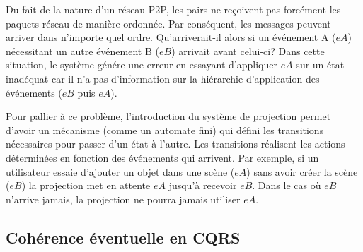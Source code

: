 Du fait de la nature d'un réseau \gls{P2P}, les pairs ne reçoivent pas forcément les 
paquets réseau de manière ordonnée.
Par conséquent, les messages peuvent arriver dans n'importe quel ordre.
Qu'arriverait-il alors si un événement A ($eA$) nécessitant un autre événement B 
($eB$) arrivait avant celui-ci? Dans cette situation, le système génére une 
erreur en essayant d'appliquer $eA$ sur un état inadéquat car il n'a pas 
d'information sur la hiérarchie d'application des événements ($eB$ puis $eA$).

Pour pallier à ce problème, l'introduction du système de projection permet d'avoir 
un mécanisme (comme un automate fini) qui défini les transitions nécessaires 
pour 
passer d'un état à l'autre. Les transitions réalisent les actions déterminées en 
fonction des 
événements qui arrivent. Par exemple, si un utilisateur essaie d'ajouter un objet 
dans une 
scène  ($eA$) sans avoir créer la scène ($eB$) la projection met en attente $eA$ 
jusqu'à recevoir $eB$. Dans le cas où $eB$ n'arrive jamais, la projection ne pourra 
jamais utiliser $eA$.

\subsection{Cohérence éventuelle en CQRS}


